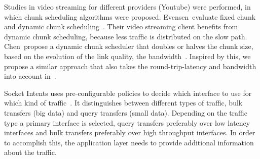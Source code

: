 Studies in video streaming for different providers (\eg Youtube) were performed, in which chunk scheduling algorithms were proposed. 
Evensen~\etal evaluate fixed chunk and dynamic chunk scheduling~\cite{EVENSEN11-ITP}. 
Their video streaming client benefits from dynamic chunk scheduling, because less traffic is distributed on the slow path. 
Chen~\etal propose a dynamic chunk scheduler that doubles or halves the chunk size, based on the evolution of the link quality, \ie the bandwidth~\cite{CHEN14-MMA}. 
Inspired by this, we propose a similar approach that also takes the round-trip-latency and bandwidth into account in~. 


Socket Intents uses pre-configurable policies to decide which interface to use for which kind of traffic~\cite{SCHMIDT13-SIL}. 
It distinguishes between different types of traffic, \eg bulk transfers (big data) and query transfers (small data). 
Depending on the traffic type a primary interface is selected, \eg query transfers preferably over low latency interfaces and bulk transfers preferably over high throughput interfaces. 
In order to accomplish this, the application layer needs to provide additional information about the traffic. 

